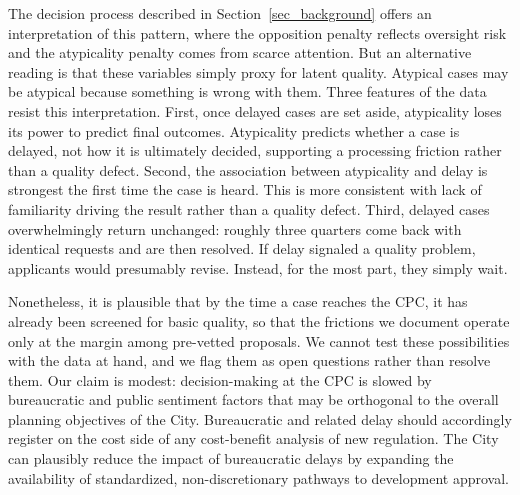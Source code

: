 The decision process described in Section~\ref{sec_background} offers an interpretation of this pattern, where the opposition penalty reflects oversight risk and the atypicality penalty comes from scarce attention. But an alternative reading is that these variables simply proxy for latent quality. Atypical cases may be atypical because something is wrong with them. Three features of the data resist this interpretation. First, once delayed cases are set aside, atypicality loses its power to predict final outcomes. Atypicality predicts whether a case is delayed, not how it is ultimately decided, supporting a processing friction rather than a quality defect. Second, the association between atypicality and delay is strongest the first time the case is heard. This is more consistent with lack of familiarity driving the result rather than a quality defect. Third, delayed cases overwhelmingly return unchanged: roughly three quarters come back with identical requests and are then resolved. If delay signaled a quality problem, applicants would presumably revise. Instead, for the most part, they simply wait.

Nonetheless, it is plausible that by the time a case reaches the CPC, it has already been screened for basic quality, so that the frictions we document operate only at the margin among pre-vetted proposals. We cannot test these possibilities with the data at hand, and we flag them as open questions rather than resolve them. Our claim is modest: decision-making at the CPC is slowed by bureaucratic and public sentiment factors that may be orthogonal to the overall planning objectives of the City. Bureaucratic and related delay should accordingly register on the cost side of any cost-benefit analysis of new regulation. The City can plausibly reduce the impact of bureaucratic delays by expanding the availability of standardized, non-discretionary pathways to development approval.   

